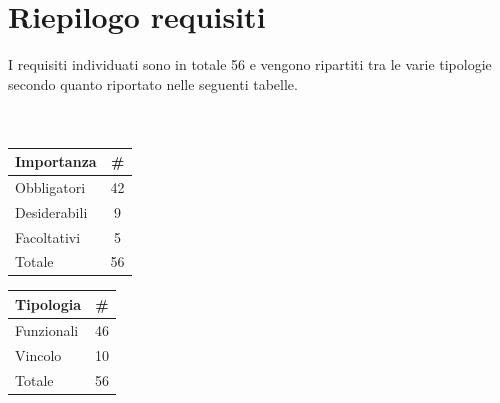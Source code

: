 \section{Riepilogo requisiti}
I requisiti individuati sono in totale 56 e vengono ripartiti tra le varie tipologie secondo quanto riportato nelle seguenti tabelle.
\\ \\ \\
\begin{minipage}{\textwidth}
	\begin{minipage}[b]{0.49\textwidth}
		\centering
		\begin{tabular}{|l|c|} \hline
			\textbf{Importanza} & \textbf{\#} \\ \hline
			Obbligatori & 42 \\ \hline
			Desiderabili & 9 \\ \hline
			Facoltativi & 5 \\ \hline
			Totale & 56 \\ \hline
		\end{tabular}
	\end{minipage}
	\hfill
	\begin{minipage}[b]{0.49\textwidth}
		\centering
		\begin{tabular}{|l|c|} \hline
			\textbf{Tipologia} & \textbf{\#} \\ \hline
			Funzionali & 46 \\ \hline
			Vincolo & 10 \\ \hline
			Totale & 56 \\ \hline
		\end{tabular}
	\end{minipage}
\end{minipage}
\\ \\ \\

